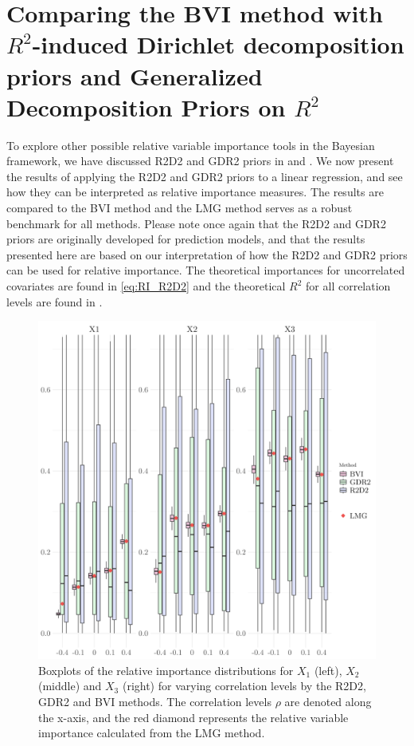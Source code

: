 \section{Comparing the BVI method with \texorpdfstring{$R^2$}{Lg}-induced Dirichlet decomposition priors and Generalized Decomposition Priors on \texorpdfstring{$R^2$}{Lg}}
To explore other possible relative variable importance tools in the Bayesian framework, we have discussed R2D2 and GDR2 priors in  and . We now present the results of applying the R2D2 and GDR2 priors to a linear regression, and see how they can be interpreted as relative importance measures. The results are compared to the BVI method and the LMG method serves as a robust benchmark for all methods. Please note once again that the R2D2 and GDR2 priors are originally developed for prediction models, and that the results presented here are based on our interpretation of how the R2D2 and GDR2 priors can be used for relative importance. The theoretical importances for uncorrelated covariates are found in \eqref{eq:RI_R2D2} and the theoretical $R^2$ for all correlation levels are found in . 
\begin{figure}[H]%
  \centering
  \includegraphics[width=1\linewidth]{Figures/R2D2_BVI_Comparison/R2D2_BVI_boxplot.png}
  \caption[Comparison of the relative importance from the BVI method and the shrinkage prior methods]{Boxplots of the relative importance distributions for $X_1$ (left), $X_2$ (middle) and $X_3$ (right) for varying correlation levels by the R2D2, GDR2 and BVI methods. The correlation levels $\rho$ are denoted along the x-axis, and the red diamond represents the relative variable importance calculated from the LMG method.}
  \label{fig:r2d2_importance}
\end{figure}
